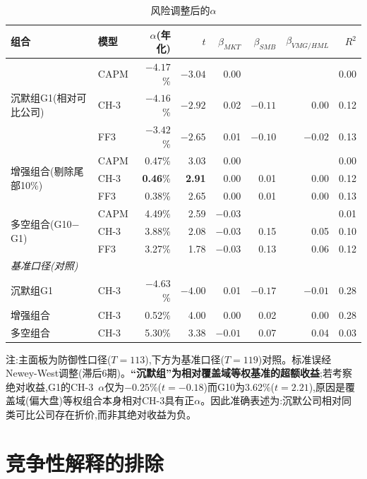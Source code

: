 \documentclass[UTF8, a4paper, fontset=fandol, zihao=-4]{ctexart}
\begin{document}
\begin{table}[H]
\centering
\begin{threeparttable}
\caption{风险调整后的$\alpha$}\label{tab:alpha}
\begin{tabular}{llrrrrrr}
\toprule
组合 & 模型 & $\alpha$(年化) & $t$ & $\beta_{MKT}$ & $\beta_{SMB}$ & $\beta_{VMG/HML}$ & $R^2$ \\
\midrule
\multirow{3}{*}{沉默组G1(相对可比公司)}
 & CAPM & $-4.17$\% & $-3.04$ & 0.00 & & & 0.00 \\
 & CH-3 & $\mathbf{-4.16}$\% & $\mathbf{-2.92}$ & 0.02 & $-0.11$ & 0.00 & 0.12 \\
 & FF3 & $-3.42$\% & $-2.65$ & 0.01 & $-0.10$ & $-0.02$ & 0.13 \\
\midrule
\multirow{3}{*}{增强组合(剔除尾部10\%)}
 & CAPM & 0.47\% & 3.03 & 0.00 & & & 0.00 \\
 & CH-3 & \textbf{0.46}\% & \textbf{2.91} & 0.00 & 0.01 & 0.00 & 0.12 \\
 & FF3 & 0.38\% & 2.65 & 0.00 & 0.01 & 0.00 & 0.13 \\
\midrule
\multirow{3}{*}{多空组合(G10$-$G1)}
 & CAPM & 4.49\% & 2.59 & $-0.03$ & & & 0.01 \\
 & CH-3 & 3.88\% & 2.08 & $-0.03$ & 0.15 & 0.05 & 0.10 \\
 & FF3 & 3.27\% & 1.78 & $-0.03$ & 0.13 & 0.06 & 0.12 \\
\midrule
\multicolumn{8}{l}{\emph{基准口径(对照)}} \\
沉默组G1 & CH-3 & $-4.63$\% & $-4.00$ & 0.01 & $-0.17$ & $-0.01$ & 0.28 \\
增强组合 & CH-3 & 0.52\% & 4.00 & 0.00 & 0.02 & 0.00 & 0.28 \\
多空组合 & CH-3 & 5.30\% & 3.38 & $-0.01$ & 0.07 & 0.04 & 0.03 \\
\bottomrule
\end{tabular}
\begin{tablenotes}
\item 注:主面板为防御性口径($T=113$),下方为基准口径($T=119$)对照。标准误经Newey-West调整(滞后6期)。\textbf{“沉默组”为相对覆盖域等权基准的超额收益};若考察绝对收益,G1的CH-3~$\alpha$仅为$-0.25$\%($t=-0.18$)而G10为3.62\%($t=2.21$),原因是覆盖域(偏大盘)等权组合本身相对CH-3具有正$\alpha$。因此准确表述为:沉默公司相对同类可比公司存在折价,而非其绝对收益为负。
\end{tablenotes}
\end{threeparttable}
\end{table}

\section{竞争性解释的排除}
\end{document}
